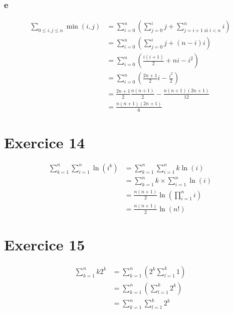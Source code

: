 \documentclass{report}
\begin{document}
\subsubsection*{e}

\begin{equation*}
	\begin{split}
		\sum_{0 \le i, j \le n} \min(i,j)
		    &= \sum_{i=0}^{n} \left( \sum_{j=0}^{i} j + \sum_{j=i+1 \text{ si } i<n}^{n}i\right) \\
			&= \sum_{i=0}^{n} \left( \sum_{j=0}^{i} j +(n-i)i\right)  \\
			&=\sum_{i=0}^{n} \left( \frac{i(i+1)}{2} + ni-i^2\right) \\
			&=\sum_{i=0}^{n} \left( \frac{2n+1}{2}i -\frac{i^2}{2}\right) \\
			&= \frac{2n+1}{2} \frac{n(n+1)}{2} - \frac{n(n+1)(2n+1)}{12} \\
			&= \frac{n(n+1)(2n+1)}{6}
	\end{split}
\end{equation*}

\section*{Exercice 14}

\begin{equation*}
	\begin{split}
		\sum_{k=1}^{n} \sum_{i=1}^{n}\ln(i^k)
			&=  \sum_{k=1}^{n} \sum_{i=1}^{n} k\ln(i)\\
			&=  \sum_{k=1}^{n} k \times \sum_{i=1}^{n} \ln(i)\\
			&= \frac{n(n+1)}{2} \ln\left( \prod_{i=1}^{n}i\right) \\
			&= \frac{n(n+1)}{2} \ln\left( n! \right)
	\end{split}
\end{equation*}


\section*{Exercice 15}

\begin{equation*}
	\begin{split}
		\sum_{k=1}^{n} k2^k
		&=  \sum_{k=1}^{n}\left(2^k \sum_{l=1}^{k}1\right)\\
		&=  \sum_{k=1}^{n}\left(\sum_{l=1}^{k} 2^k\right)\\
		&=  \sum_{k=1}^{n}\sum_{l=1}^{k} 2^k\\
	\end{split}
\end{equation*}
\end{document}
